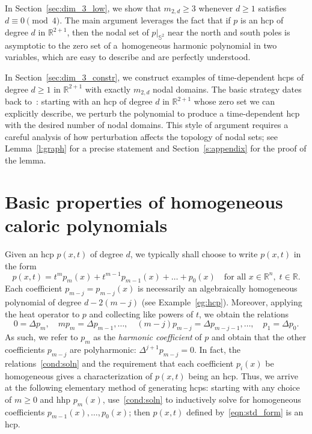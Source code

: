 \documentclass[10pt]{amsart}
\theoremstyle{definition}\newtheorem{defi}[theo]{Definition}\newtheorem{rema}[theo]{Remark}\newtheorem{exam}[theo]{Example}\newtheorem{exem}[theo]{Example}\newtheorem{nota}[theo]{Notation}
\newcommand{\R}{\mathbb{R}}
\newcommand{\sphere}{\mathbb{S}}
\begin{document}
In Section~\ref{sec:dim_3_low}, we show that $m_{2,d} \ge 3$ whenever $d \ge 1$ satisfies $d \equiv 0 \pmod 4$. The main argument leverages the fact that if $p$ is an hcp of degree $d$ in $\R^{2+1}$, then the nodal set of $p|_{\sphere^2}$ near the north and south poles is asymptotic to the zero set of a~homogeneous harmonic polynomial in two variables, which are easy to describe and are perfectly understood.

In Section~\ref{sec:dim_3_constr}, we construct examples of time-dependent hcps of degree $d \ge 1$ in $\R^{2+1}$ with exactly $m_{2,d}$ nodal domains. The basic strategy dates back to~\cite{Lewy77}: starting with an hcp of degree $d$ in $\R^{2+1}$ whose zero set we can explicitly describe, we perturb the polynomial to produce a time-dependent hcp with the desired number of nodal domains. This style of argument requires a careful analysis of how perturbation affects the topology of nodal sets; see Lemma~\ref{l:graph} for a precise statement and Section~\ref{s:appendix} for the proof of the lemma.


\section{Basic properties of homogeneous caloric polynomials}\label{sec:prop}

Given an hcp $p(x,t)$ of degree $d$, we typically shall choose to write $p(x,t)$ in the form
\begin{equation}\label{eqn:std_form}
p(x,t) = t^m p_m(x) + t^{m-1} p_{m-1}(x) + \dots + p_0(x)\quad \text{for all }x\in\R^n, \;t\in\R.
\end{equation}
Each coefficient $p_{m-j}=p_{m-j}(x)$ is necessarily an algebraically homogeneous polynomial of degree $d - 2(m-j)$ (see Example~\ref{eg:hcp}). Moreover, applying the heat operator to $p$ and collecting like powers of $t$, we obtain the relations
\begin{equation}\label{cond:soln}
0 = \Delta p_m,\quad m p_m = \Delta p_{m-1}, \dots, \quad (m-j) p_{m-j} = \Delta p_{m-j-1},\dots,\quad p_1 = \Delta p_0.
\end{equation}
As such, we refer to $p_m$ as the \emph{harmonic coefficient} of $p$ and obtain that the other coefficients $p_{m-j}$ are polyharmonic: $\Delta^{j+1} p_{m-j} = 0$. In fact, the relations~\eqref{cond:soln} and the requirement that each coefficient $p_i(x)$ be homogeneous gives a characterization of $p(x,t)$ being an hcp. Thus, we arrive at the following elementary method of generating hcps: starting with any choice of $m\geq 0$ and hhp $p_m(x)$, use~\eqref{cond:soln} to inductively solve for homogeneous coefficients $p_{m-1}(x), \dots, p_0(x)$; then $p(x,t)$ defined by~\eqref{eqn:std_form} is an hcp.
\end{document}
